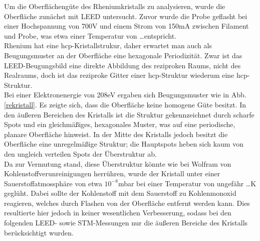 \FloatBarrier

Um die Oberflächengüte des Rheniumkristalls zu analysieren, wurde die Oberfläche zunächst mit LEED
untersucht. Zuvor wurde die Probe geflasht bei einer Hochspannung von 700V und einem Strom
von 150mA zwischen Filament und Probe, was etwa einer Temperatur von \ldots entspricht.\\
Rhenium hat eine hcp-Kristallstrukur, daher erwartet man auch als Beugungsmuster an der Oberfläche
eine hexagonale Periodizität. Zwar ist das LEED-Beugungsbild eine direkte Abbildung des reziproken
Raums, nicht des Realraums, doch ist das reziproke Gitter einer hcp-Struktur wiederum eine
hcp-Struktur.\\
Bei einer Elektronenergie von 208eV ergaben sich Beugungsmuster wie in Abb. \ref{rekristall}. Es
zeigte sich, dass die Oberfläche keine homogene Güte besitzt. In den äußeren Bereichen des Kristalls
ist die Struktur gekennzeichnet durch scharfe Spots und ein gleichmäßiges, hexagonales Muster, was
auf eine periodische, planare Oberfläche hinweist. In der Mitte des Kristalls jedoch besitzt die
Oberfläche eine unregelmäßige Struktur; die Hauptspots heben sich kaum von den ungleich verteilen
Spots der Überstruktur ab. \\
Da zur Vermutung stand, diese Überstruktur könnte wie bei Wolfram von Kohlenstoffverunreinigungen
herrühren, wurde der Kristall unter einer Sauerstoffatmossphäre von etwa $10^{-8}$mbar bei einer
Temperatur von ungefähr \ldots K geglüht. Dabei sollte der Kohlenstoff mit dem Sauerstoff zu
Kohlenmonoxid reagieren, welches durch Flashen von der Oberfläche entfernt werden kann. Dies
resultierte hier jedoch in keiner wesentlichen Verbesserung, sodass bei den folgenden LEED- sowie STM-Messungen
nur die äußeren Bereiche des Kristalls berücksichtigt wurden.\\


